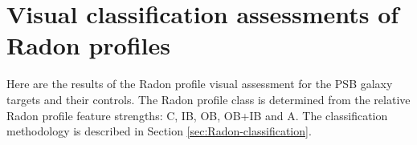 \onecolumn

\section{Visual classification assessments of Radon profiles}
\label{sec:visual-classification-tables}


Here are the results of the Radon profile visual assessment for the PSB galaxy targets and their controls. The Radon profile class is determined from the relative Radon profile feature strengths: C, IB, OB, OB+IB and A. The classification methodology is described in Section \ref{sec:Radon-classification}.


